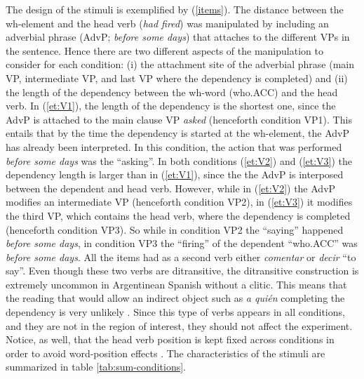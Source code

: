 \documentclass{frontiersSCNS}\usepackage{knitr}
\begin{document}
The design of the stimuli is exemplified by (\ref{items}). The distance between the wh-element and the head verb (\textit{had fired}) was manipulated by including an adverbial phrase (AdvP; \textit{before some days}) that attaches to the different VPs in the sentence. Hence there are two different aspects of the manipulation to consider for each condition: (i) the attachment site of the adverbial phrase (main VP, intermediate VP, and last VP where the dependency is completed) and (ii) the length of the dependency between the wh-word (who.ACC) and the head verb.  In (\ref{et:V1}), the length of the dependency is the shortest one, since the AdvP is attached to the main clause VP \textit{asked} (henceforth condition VP1). This entails that by the time the dependency is started at the wh-element, the AdvP has already been interpreted. In this condition, the action that was performed \textit{before some days} was the ``asking''. In both conditions (\ref{et:V2}) and (\ref{et:V3}) the dependency length is larger than in (\ref{et:V1}), since the the AdvP is interposed between the dependent and head verb. However, while in (\ref{et:V2}) the AdvP modifies an intermediate VP (henceforth condition VP2), in (\ref{et:V3}) it modifies the third VP, which contains the head verb, where the dependency is completed (henceforth condition VP3). So while in condition VP2 the ``saying'' happened \textit{before some days}, in condition VP3 the ``firing'' of the dependent ``who.ACC''  was \textit{before some days}. All the items had as a second verb either \emph{comentar} or \emph{decir} ``to say''. Even though these two verbs are ditransitive, the ditransitive construction is extremely uncommon in Argentinean Spanish without a clitic. This means that the reading that would allow an indirect object such as \emph{a quién} completing the dependency is very unlikely \citep[for a similar construction in Spanish with clitic left-dislocation, see ][]{Pablos2006}. Since this type of verbs appears in all conditions, and they are not in the region of interest, they should not affect the experiment. Notice, as well, that the head verb position is kept fixed across conditions in order to avoid word-position effects \citep{FerreiraHenderson1993}. The characteristics of the stimuli are summarized in table \ref{tab:sum-conditions}.
\end{document}
